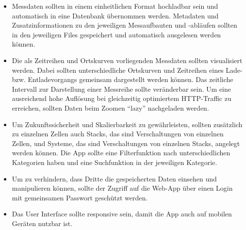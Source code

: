 \begin{itemize}

\item Messdaten sollten in einem einheitlichen Format hochladbar sein und automatisch in eine Datenbank übernommen werden. Metadaten und Zusatzinformationen zu den jeweiligen Messaufbauten und -abläufen sollten in den jeweiligen Files gespeichert und automatisch ausgelesen werden können.

\item Die als Zeitreihen und Ortskurven vorliegenden Messdaten sollten visualisiert werden. Dabei sollten unterschiedliche Ortskurven und Zeitreihen eines Lade- bzw. Entladevorgangs gemeinsam dargestellt werden können. Das zeitliche Intervall zur Darstellung einer Messreihe sollte veränderbar sein. Um eine ausreichend hohe Auflösung bei gleichzeitig optimiertem HTTP-Traffic zu erreichen, sollten Daten beim Zoomen ``lazy'' nachgeladen werden.

\item Um Zukunftssicherheit und Skalierbarkeit zu gewährleisten, sollten zusätzlich zu einzelnen Zellen auch Stacks, das sind Verschaltungen von einzelnen Zellen, und Systeme, das sind Verschaltungen von einzelnen Stacks, angelegt werden können. Die App sollte eine Filterfunktion nach unterschiedlichen Kategorien haben und eine Suchfunktion in der jeweiligen Kategorie.

\item Um zu verhindern, dass Dritte die gespeicherten Daten einsehen und manipulieren können, sollte der Zugriff auf die Web-App über einen Login mit gemeinsamen Passwort geschützt werden.

\item Das User Interface sollte responsive sein, damit die App auch auf mobilen Geräten nutzbar ist.

\end{itemize}
